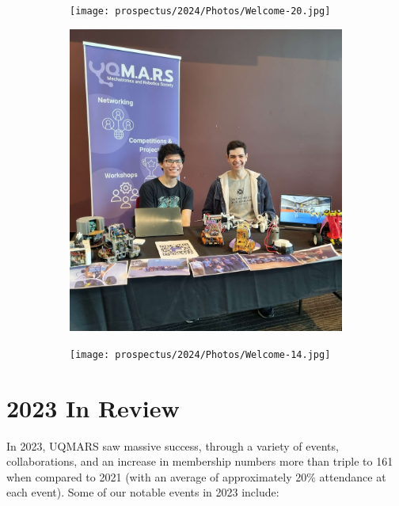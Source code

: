 \documentclass[a4paper,12pt]{report}
\begin{document}
\begin{figure}[H]
    \centering
    \begin{subfigure}{0.32\linewidth}
        \texttt{[image: prospectus/2024/Photos/Welcome-20.jpg]}
    \end{subfigure}
    \begin{subfigure}{0.28\linewidth}
        \includegraphics[width=0.99\linewidth]{prospectus/2024/Photos/2023Sem2EAITExpo1.jpg}
    \end{subfigure}
    \begin{subfigure}{0.32\linewidth}
        \texttt{[image: prospectus/2024/Photos/Welcome-14.jpg]}
    \end{subfigure}
\end{figure}


\newpage

\section*{2023 In Review}

In 2023, UQMARS saw massive success, through a variety of events, collaborations, and an increase in membership numbers more than triple to 161 when compared to 2021 (with an average of approximately 20\% attendance at each event).
Some of our notable events in 2023 include:
\end{document}

